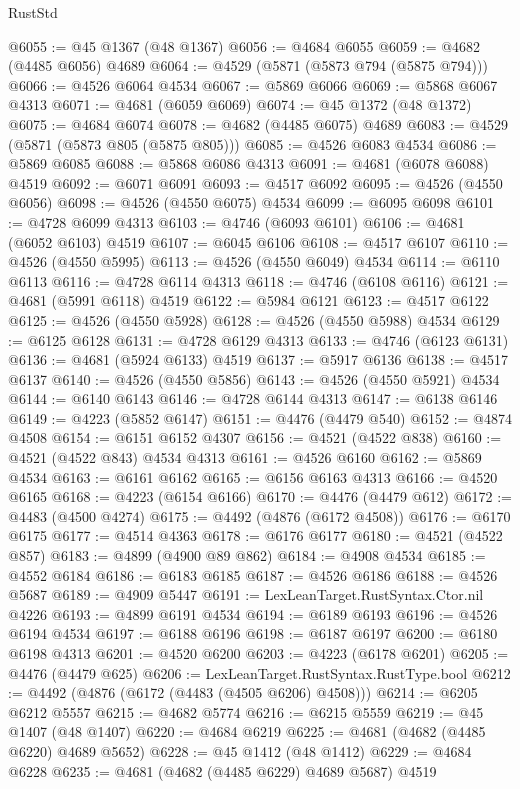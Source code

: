\begin{lexlean}{RustStd}
\begin{coremodule}
@6055 := @45 @1367 (@48 @1367)
@6056 := @4684 @6055
@6059 := @4682 (@4485 @6056) @4689
@6064 := @4529 (@5871 (@5873 @794 (@5875 @794)))
@6066 := @4526 @6064 @4534
@6067 := @5869 @6066
@6069 := @5868 @6067 @4313
@6071 := @4681 (@6059 @6069)
@6074 := @45 @1372 (@48 @1372)
@6075 := @4684 @6074
@6078 := @4682 (@4485 @6075) @4689
@6083 := @4529 (@5871 (@5873 @805 (@5875 @805)))
@6085 := @4526 @6083 @4534
@6086 := @5869 @6085
@6088 := @5868 @6086 @4313
@6091 := @4681 (@6078 @6088) @4519
@6092 := @6071 @6091
@6093 := @4517 @6092
@6095 := @4526 (@4550 @6056)
@6098 := @4526 (@4550 @6075) @4534
@6099 := @6095 @6098
@6101 := @4728 @6099 @4313
@6103 := @4746 (@6093 @6101)
@6106 := @4681 (@6052 @6103) @4519
@6107 := @6045 @6106
@6108 := @4517 @6107
@6110 := @4526 (@4550 @5995)
@6113 := @4526 (@4550 @6049) @4534
@6114 := @6110 @6113
@6116 := @4728 @6114 @4313
@6118 := @4746 (@6108 @6116)
@6121 := @4681 (@5991 @6118) @4519
@6122 := @5984 @6121
@6123 := @4517 @6122
@6125 := @4526 (@4550 @5928)
@6128 := @4526 (@4550 @5988) @4534
@6129 := @6125 @6128
@6131 := @4728 @6129 @4313
@6133 := @4746 (@6123 @6131)
@6136 := @4681 (@5924 @6133) @4519
@6137 := @5917 @6136
@6138 := @4517 @6137
@6140 := @4526 (@4550 @5856)
@6143 := @4526 (@4550 @5921) @4534
@6144 := @6140 @6143
@6146 := @4728 @6144 @4313
@6147 := @6138 @6146
@6149 := @4223 (@5852 @6147)
@6151 := @4476 (@4479 @540)
@6152 := @4874 @4508
@6154 := @6151 @6152 @4307
@6156 := @4521 (@4522 @838)
@6160 := @4521 (@4522 @843) @4534 @4313
@6161 := @4526 @6160
@6162 := @5869 @4534
@6163 := @6161 @6162
@6165 := @6156 @6163 @4313
@6166 := @4520 @6165
@6168 := @4223 (@6154 @6166)
@6170 := @4476 (@4479 @612)
@6172 := @4483 (@4500 @4274)
@6175 := @4492 (@4876 (@6172 @4508))
@6176 := @6170 @6175
@6177 := @4514 @4363
@6178 := @6176 @6177
@6180 := @4521 (@4522 @857)
@6183 := @4899 (@4900 @89 @862)
@6184 := @4908 @4534
@6185 := @4552 @6184
@6186 := @6183 @6185
@6187 := @4526 @6186
@6188 := @4526 @5687
@6189 := @4909 @5447
@6191 := LexLeanTarget.RustSyntax.Ctor.nil @4226
@6193 := @4899 @6191 @4534
@6194 := @6189 @6193
@6196 := @4526 @6194 @4534
@6197 := @6188 @6196
@6198 := @6187 @6197
@6200 := @6180 @6198 @4313
@6201 := @4520 @6200
@6203 := @4223 (@6178 @6201)
@6205 := @4476 (@4479 @625)
@6206 := LexLeanTarget.RustSyntax.RustType.bool
@6212 := @4492 (@4876 (@6172 (@4483 (@4505 @6206) @4508)))
@6214 := @6205 @6212 @5557
@6215 := @4682 @5774
@6216 := @6215 @5559
@6219 := @45 @1407 (@48 @1407)
@6220 := @4684 @6219
@6225 := @4681 (@4682 (@4485 @6220) @4689 @5652)
@6228 := @45 @1412 (@48 @1412)
@6229 := @4684 @6228
@6235 := @4681 (@4682 (@4485 @6229) @4689 @5687) @4519

\end{coremodule}
\end{lexlean}
